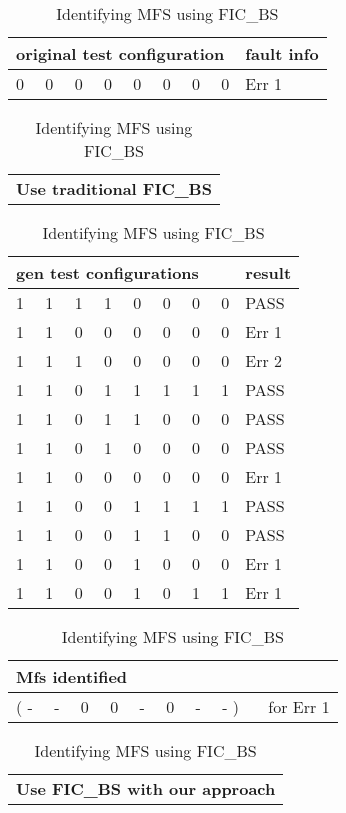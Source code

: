 \documentclass{sig-alternate}
\begin{document}
\begin{table}\renewcommand{\arraystretch}{1.3}
\caption{Identifying MFS using FIC\_BS}
\label{fic-examples}

\begin{tabular}{|p{}|p{}|} \hline
\bfseries original test configuration & \bfseries fault info \\ \hline
0 \ \ 0 \ \ 0 \ \ 0 \ \  0 \ \ 0 \ \  0 \ \ 0  & Err 1
\end{tabular}

\begin{tabular}{|p{}|} \hline
\bfseries Use traditional FIC\_BS
\end{tabular}

\begin{tabular}{|p{}|p{}|} \hline
\bfseries gen test configurations   &\bfseries result \\ \hline
1 \ \ 1 \ \ 1 \ \ 1 \ \  0 \ \ 0 \ \  0 \ \ 0  & PASS \\
1 \ \ 1 \ \ 0 \ \ 0 \ \  0 \ \ 0 \ \  0 \ \ 0  & Err 1 \\
1 \ \ 1 \ \ 1 \ \ 0 \ \  0 \ \ 0 \ \  0 \ \ 0  & Err 2 \\
1 \ \ 1 \ \ 0 \ \ 1 \ \  1 \ \ 1 \ \  1 \ \ 1  & PASS \\
1 \ \ 1 \ \ 0 \ \ 1 \ \  1 \ \ 0 \ \  0 \ \ 0  & PASS \\
1 \ \ 1 \ \ 0 \ \ 1 \ \  0 \ \ 0 \ \  0 \ \ 0  & PASS \\
1 \ \ 1 \ \ 0 \ \ 0 \ \  0 \ \ 0 \ \  0 \ \ 0  & Err 1 \\
1 \ \ 1 \ \ 0 \ \ 0 \ \  1 \ \ 1 \ \  1 \ \ 1  & PASS \\
1 \ \ 1 \ \ 0 \ \ 0 \ \  1 \ \ 1 \ \  0 \ \ 0  & PASS \\
1 \ \ 1 \ \ 0 \ \ 0 \ \  1 \ \ 0 \ \  0 \ \ 0  & Err 1 \\
1 \ \ 1 \ \ 0 \ \ 0 \ \  1 \ \ 0 \ \  1 \ \ 1  & Err 1 \\
\end{tabular}

\begin{tabular}{|p{}|} \hline
\bfseries Mfs identified \\ \hline
( - \ \ - \ \ 0 \ \ 0 \ \  - \ \ 0 \ \ - \ \ - ) \ \ \ for Err 1 \\
\hline
\end{tabular}

\begin{tabular}{|p{}|}
\bfseries Use FIC\_BS with our approach
\end{tabular}


\end{table}
\end{document}
